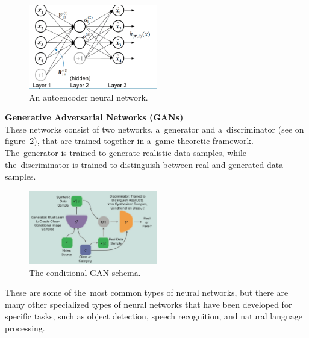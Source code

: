     \begin{center}
        \begin{figure}[!ht]
            \centering
            \includegraphics[width=0.5\textwidth]{figures/ann}
            \caption{An autoencoder neural network. \cite{luo2018distributed}}
            \label{fig:ann}
        \end{figure}
    \end{center}
    \textbf{Generative Adversarial Networks (GANs)}\\
    These networks consist of two networks, a~generator and a~discriminator (see on figure~\ref{fig:gan}), that are trained together in a~game-theoretic framework. The~generator is trained to generate realistic data samples, while the~discriminator is trained to distinguish between real and generated data samples.
    \begin{center}
        \begin{figure}[!ht]
            \centering
            \includegraphics[width=0.5\textwidth]{figures/gan}
            \caption{The conditional GAN schema. \cite{creswell2018generative}}
            \label{fig:gan}
        \end{figure}
    \end{center}

    These are some of the~most common types of neural networks, but there are many other specialized types of neural networks that have been developed for specific tasks, such as object detection, speech recognition, and
natural language processing.\\

